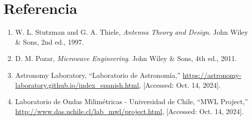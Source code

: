 \section{Referencia}
\begin{enumerate}
    \item W. L. Stutzman and G. A. Thiele, \textit{Antenna Theory and Design}. John Wiley \& Sons, 2nd ed., 1997.
    \item D. M. Pozar, \textit{Microwave Engineering}. John Wiley \& Sons, 4th ed., 2011.
    \item Astronomy Laboratory, ``Laboratorio de Astronomía,'' \url{https://astronomy-laboratory.github.io/index_spanish.html}, [Accessed: Oct. 14, 2024].
    \item Laboratorio de Ondas Milimétricas - Universidad de Chile, ``MWL Project,'' \url{http://www.das.uchile.cl/lab_mwl/project.html}, [Accessed: Oct. 14, 2024].
\end{enumerate}
